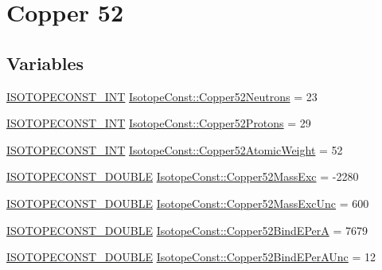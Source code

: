 \hypertarget{group___isotope_const-_copper-_cu52}{}\section{Copper 52}
\label{group___isotope_const-_copper-_cu52}
\subsection*{Variables}
\begin{DoxyCompactItemize}
\item 
\mbox{\hyperlink{group___isotope_const-_macros_ga5f18360b3e99483a35c32d789e62621c}{I\+S\+O\+T\+O\+P\+E\+C\+O\+N\+S\+T\+\_\+\+I\+NT}} \mbox{\hyperlink{group___isotope_const-_copper-_cu52_gab66a88d28aec2cf1990ffbb537509a23}{Isotope\+Const\+::\+Copper52\+Neutrons}} = 23
\item 
\mbox{\hyperlink{group___isotope_const-_macros_ga5f18360b3e99483a35c32d789e62621c}{I\+S\+O\+T\+O\+P\+E\+C\+O\+N\+S\+T\+\_\+\+I\+NT}} \mbox{\hyperlink{group___isotope_const-_copper-_cu52_gad4eab8718ba09868007f9e3e7b7526c9}{Isotope\+Const\+::\+Copper52\+Protons}} = 29
\item 
\mbox{\hyperlink{group___isotope_const-_macros_ga5f18360b3e99483a35c32d789e62621c}{I\+S\+O\+T\+O\+P\+E\+C\+O\+N\+S\+T\+\_\+\+I\+NT}} \mbox{\hyperlink{group___isotope_const-_copper-_cu52_ga37f7d0a0b41999b04b9e6c8d8efa5dac}{Isotope\+Const\+::\+Copper52\+Atomic\+Weight}} = 52
\item 
\mbox{\hyperlink{group___isotope_const-_macros_ga8f45a7272ce02c0b4c65c44636ed719a}{I\+S\+O\+T\+O\+P\+E\+C\+O\+N\+S\+T\+\_\+\+D\+O\+U\+B\+LE}} \mbox{\hyperlink{group___isotope_const-_copper-_cu52_ga8e5c53a272b41f6f65f92e433e7d2b89}{Isotope\+Const\+::\+Copper52\+Mass\+Exc}} = -\/2280
\item 
\mbox{\hyperlink{group___isotope_const-_macros_ga8f45a7272ce02c0b4c65c44636ed719a}{I\+S\+O\+T\+O\+P\+E\+C\+O\+N\+S\+T\+\_\+\+D\+O\+U\+B\+LE}} \mbox{\hyperlink{group___isotope_const-_copper-_cu52_gaa5dd2276091c3253f75a558a18071b8a}{Isotope\+Const\+::\+Copper52\+Mass\+Exc\+Unc}} = 600
\item 
\mbox{\hyperlink{group___isotope_const-_macros_ga8f45a7272ce02c0b4c65c44636ed719a}{I\+S\+O\+T\+O\+P\+E\+C\+O\+N\+S\+T\+\_\+\+D\+O\+U\+B\+LE}} \mbox{\hyperlink{group___isotope_const-_copper-_cu52_ga71827804c88e8c42938a47ec559dbb31}{Isotope\+Const\+::\+Copper52\+Bind\+E\+PerA}} = 7679
\item 
\mbox{\hyperlink{group___isotope_const-_macros_ga8f45a7272ce02c0b4c65c44636ed719a}{I\+S\+O\+T\+O\+P\+E\+C\+O\+N\+S\+T\+\_\+\+D\+O\+U\+B\+LE}} \mbox{\hyperlink{group___isotope_const-_copper-_cu52_gaece54db44f3e9ffcb489217ef6771acd}{Isotope\+Const\+::\+Copper52\+Bind\+E\+Per\+A\+Unc}} = 12

\end{DoxyCompactItemize}
